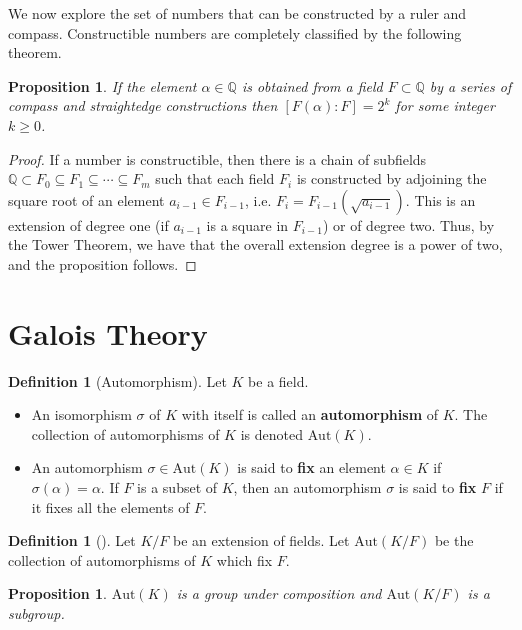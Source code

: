\documentclass[10pt, oneside, reqno]{amsart}
\theoremstyle{plain}%
\newtheorem{prop}[thm]{Proposition}
\theoremstyle{definition}
\newtheorem{defn}[thm]{Definition}
\theoremstyle{remark}
\newcommand{\Q}{\mathbb{Q}}
\newcommand{\R}{\mathbb{Q}}
\newcommand{\aut}[1]{\text{Aut}{(#1)}}
\newcommand{\xdeg}[2]{[#1 : #2]}
\begin{document}
We now explore the set of numbers that can be constructed by a ruler and compass.  Constructible numbers are completely classified by the following theorem.

\begin{prop}
    If the element $\alpha \in \R$ is obtained from a field $F \subset \R$ by a series of compass and straightedge constructions then $\xdeg{F(\alpha)}{F} = 2^k$ for some integer $k \geq 0$.
\end{prop}

\begin{proof}
    If a number is constructible, then there is a chain of subfields $\Q \subset F_0 \subseteq F_1 \subseteq \cdots \subseteq F_m$ such that each field $F_i$ is constructed by adjoining the square root of an element $a_{i-1} \in F_{i-1}$, i.e. $F_{i} = F_{i-1}(\sqrt{a_{i-1}})$.  This is an extension of degree one (if $a_{i-1}$ is a square in $F_{i-1}$) or of degree two. Thus, by the Tower Theorem, we have that the overall extension degree is a power of two, and the proposition follows.
\end{proof}




\section{Galois Theory} %
\label{cha:galois_theory}

\begin{defn}[Automorphism]
    Let $K$ be a field.  
    \begin{itemize}
        \item An isomorphism $\sigma$ of $K$ with itself is called an \textbf{automorphism} of $K$.  The collection of automorphisms of $K$ is denoted $\aut{K}$.  
        \item An automorphism $\sigma \in \aut{K}$ is said to \textbf{fix} an element $\alpha \in K$ if $\sigma(\alpha) = \alpha$.  If $F$ is a subset of $K$, then an automorphism $\sigma$ is said to \textbf{fix} $F$ if it fixes all the elements of $F$. 
    \end{itemize}
\end{defn}

\begin{defn}[]
    Let $K/F$ be an extension of fields.  Let $\aut{K/F}$ be the collection of automorphisms of $K$ which fix $F$.
\end{defn}

\begin{prop}
    $\aut{K}$ is a group under composition and $\aut{K/F}$ is a subgroup.
\end{prop}
\end{document}
